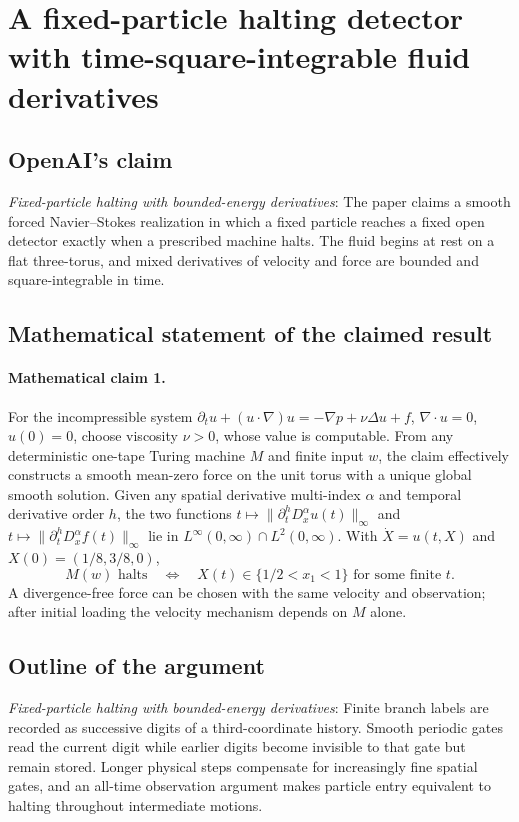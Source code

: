 \documentclass[11pt]{article}
\begin{document}
\section*{A fixed-particle halting detector with time-square-integrable fluid derivatives}

\subsection{OpenAI's claim}
\textit{Fixed-particle halting with bounded-energy derivatives}: The paper claims a smooth forced Navier--Stokes realization in which a fixed particle reaches a fixed open detector exactly when a prescribed machine halts. The fluid begins at rest on a flat three-torus, and mixed derivatives of velocity and force are bounded and square-integrable in time.

\subsection{Mathematical statement of the claimed result}
\paragraph{Mathematical claim 1.} For the incompressible system $\partial_tu+(u\cdot\nabla)u=-\nabla p+\nu\Delta u+f$, $\nabla\cdot u=0$, $u(0)=0$, choose viscosity $\nu>0$, whose value is computable. From any deterministic one-tape Turing machine $M$ and finite input $w$, the claim effectively constructs a smooth mean-zero force on the unit torus with a unique global smooth solution. Given any spatial derivative multi-index $\alpha$ and temporal derivative order $h$, the two functions $t\mapsto\|\partial_t^hD_x^\alpha u(t)\|_\infty$ and $t\mapsto\|\partial_t^hD_x^\alpha f(t)\|_\infty$ lie in $L^\infty(0,\infty)\cap L^2(0,\infty)$. With $\dot X=u(t,X)$ and $X(0)=(1/8,3/8,0)$, \[M(w)\text{ halts}\quad\Longleftrightarrow\quad X(t)\in\{1/2<x_1<1\}\text{ for some finite }t.\] A divergence-free force can be chosen with the same velocity and observation; after initial loading the velocity mechanism depends on $M$ alone.

\subsection{Outline of the argument}
\textit{Fixed-particle halting with bounded-energy derivatives}: Finite branch labels are recorded as successive digits of a third-coordinate history. Smooth periodic gates read the current digit while earlier digits become invisible to that gate but remain stored. Longer physical steps compensate for increasingly fine spatial gates, and an all-time observation argument makes particle entry equivalent to halting throughout intermediate motions.
\end{document}
